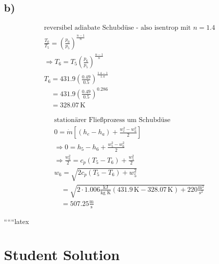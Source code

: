 

\subsection*{b)}

\begin{align*}
    &\text{reversibel adiabate Schubdüse - also isentrop mit } n = 1.4 \\
    &\frac{T_0}{T_5} = \left( \frac{p_0}{p_5} \right)^{\frac{n-1}{n}} \\
    &\Rightarrow T_6 = T_5 \left( \frac{p_6}{p_5} \right)^{\frac{n-1}{n}} \\
    &T_6 = 431.9 \left( \frac{0.49}{0.5} \right)^{\frac{1.4-1}{1.4}} \\
    &\quad = 431.9 \left( \frac{0.49}{0.5} \right)^{0.286} \\
    &\quad = 328.07 \, \text{K}
\end{align*}

\begin{align*}
    &\text{stationärer Fließprozess um Schubdüse} \\
    &0 = \dot{m} \left[ (h_e - h_a) + \frac{w_e^2 - w_a^2}{2} \right] \\
    &\Rightarrow 0 = h_5 - h_6 + \frac{w_5^2 - w_6^2}{2} \\
    &\Rightarrow \frac{w_6^2}{2} = c_p (T_5 - T_6) + \frac{w_5^2}{2} \\
    &w_6 = \sqrt{2 c_p (T_5 - T_6) + w_5^2} \\
    &\quad = \sqrt{2 \cdot 1.006 \frac{\text{kJ}}{\text{kg K}} (431.9 \, \text{K} - 328.07 \, \text{K}) + 220 \frac{\text{m}^2}{\text{s}^2}} \\
    &\quad = 507.25 \frac{\text{m}}{\text{s}}
\end{align*}

``````latex


\section*{Student Solution}